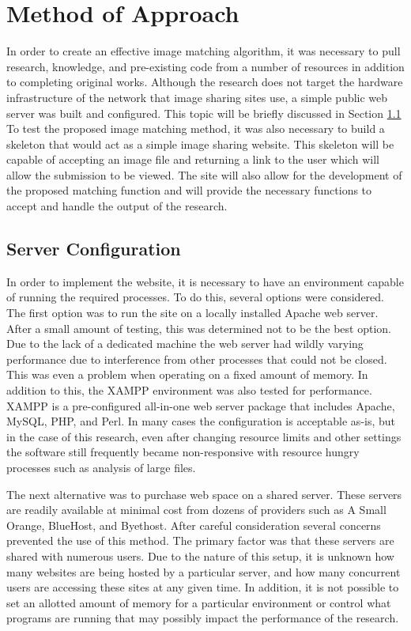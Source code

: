 %
%
%
\chapter{Method of Approach} \label{ch:method}
In order to create an effective image matching algorithm, it was necessary to pull research, knowledge, and pre-existing code from a number of resources in addition to completing original works. Although the research does not target the hardware infrastructure of the network that image sharing sites use, a simple public web server was built and configured. This topic will be briefly discussed in Section \ref{sec:serverconfig} To test the proposed image matching method, it was also necessary to build a skeleton that would act as a simple image sharing website. This skeleton will be capable of accepting an image file and returning a link to the user which will allow the submission to be viewed. The site will also allow for the development of the proposed matching function and will provide the necessary functions to accept and handle the output of the research.

\section{Server Configuration} \label{sec:serverconfig}
In order to implement the website, it is necessary to have an environment capable of running the required processes. To do this, several options were considered. The first option was to run the site on a locally installed Apache web server. After a small amount of testing, this was determined not to be the best option. Due to the lack of a dedicated machine the web server had wildly varying performance due to interference from other processes that could not be closed. This was even a problem when operating on a fixed amount of memory. In addition to this, the XAMPP environment was also tested for performance. XAMPP is a pre-configured all-in-one web server package that includes Apache, MySQL, PHP, and Perl. In many cases the configuration is acceptable as-is, but in the case of this research, even after changing resource limits and other settings the software still frequently became non-responsive with resource hungry processes such as analysis of large files.

The next alternative was to purchase web space on a shared server. These servers are readily available at minimal cost from dozens of providers such as A Small Orange, BlueHost, and Byethost. After careful consideration several concerns prevented the use of this method. The primary factor was that these servers are shared with numerous users. Due to the nature of this setup, it is unknown how many websites are being hosted by a particular server, and how many concurrent users are accessing these sites at any given time. In addition, it is not possible to set an allotted amount of memory for a particular environment or control what programs are running that may possibly impact the performance of the research.

